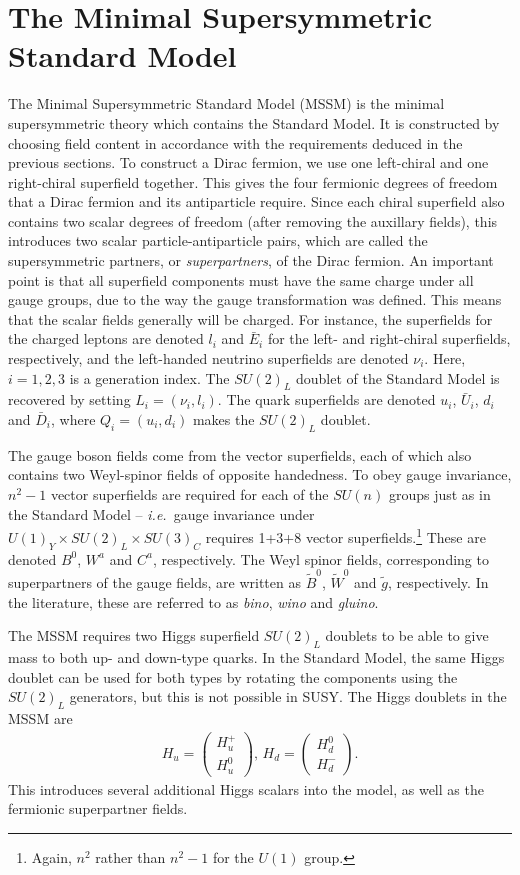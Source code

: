 \section{The Minimal Supersymmetric Standard Model}
The Minimal Supersymmetric Standard Model (MSSM) is the minimal supersymmetric theory which contains the Standard Model. It is constructed by choosing field content in accordance with the requirements deduced in the previous sections. To construct a Dirac fermion, we use one left-chiral and one right-chiral superfield together. This gives the four fermionic degrees of freedom that a Dirac fermion and its antiparticle require. Since each chiral superfield also contains two scalar degrees of freedom (after removing the auxillary fields), this introduces two scalar particle-antiparticle pairs, which are called the supersymmetric partners, or {\it superpartners}, of the Dirac fermion. An important point is that all superfield components must have the same charge under all gauge groups, due to the way the gauge transformation was defined. This means that the scalar fields generally will be charged. For instance, the superfields for the charged leptons are denoted $l_i$ and $\bar E_i$ for the left- and right-chiral superfields, respectively, and the left-handed neutrino superfields are denoted $\nu_i$. Here, $i=1,2,3$ is a generation index. The $SU(2)_L$ doublet of the Standard Model is recovered by setting $L_i = (\nu_i, l_i)$. The quark superfields are denoted $u_i$, $\bar U_i$, $d_i$ and $\bar D_i$, where $Q_i = (u_i, d_i)$ makes the $SU(2)_L$ doublet.

The gauge boson fields come from the vector superfields, each of which also contains two Weyl-spinor fields of opposite handedness. To obey gauge invariance, $n^2-1$ vector superfields are required for each of the $SU(n)$ groups just as in the Standard Model -- {\it i.e.}\ gauge invariance under $U(1)_Y\times SU(2)_L \times SU(3)_C$ requires 1+3+8 vector superfields.\footnote{Again, $n^2$ rather than $n^2-1$ for the $U(1)$ group.} These are denoted $B^0$, $W^a$ and $C^a$, respectively. The Weyl spinor fields, corresponding to superpartners of the gauge fields, are written as $\tilde B^0$, $\tilde W^0$ and $\tilde g$, respectively. In the literature, these are referred to as {\it bino}, {\it wino} and {\it gluino}. 

The MSSM requires two Higgs superfield $SU(2)_L$ doublets to be able to give mass to both up- and down-type quarks. In the Standard Model, the same Higgs doublet can be used for both types by rotating the components using the $SU(2)_L$ generators, but this is not possible in SUSY. The Higgs doublets in the MSSM are
\begin{align}
	H_u = \begin{pmatrix}
		H_u^+ \\ H_u^0
	\end{pmatrix}, \, H_d = \begin{pmatrix}
		H_d^0 \\ H_d^-
	\end{pmatrix}.
\end{align}
This introduces several additional Higgs scalars into the model, as well as the fermionic superpartner fields.


